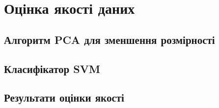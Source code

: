 
\chapter{Оцінка якості даних} %

\label{Chapter25} %

\section{Алгоритм PCA для зменшення розмірності}
\section{Класифікатор SVM}
\section{Результати оцінки якості}